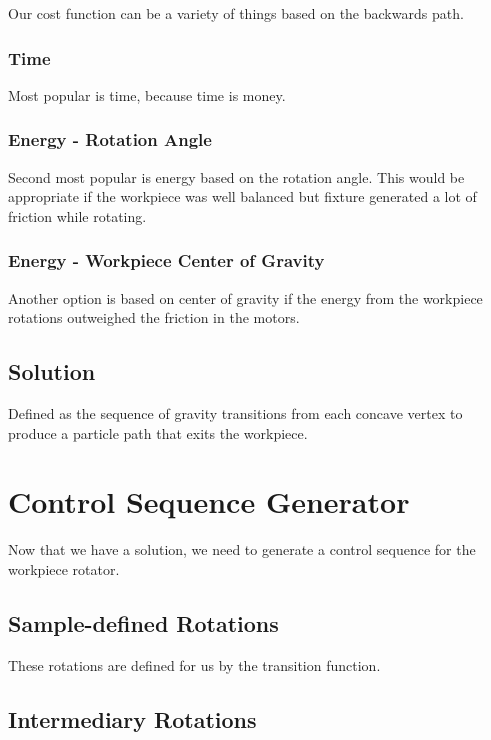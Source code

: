 Our cost function can be a variety of things based on the backwards path.

		\subsubsection{Time}

Most popular is time, because time is money.

		\subsubsection{Energy - Rotation Angle}

Second most popular is energy based on the rotation angle. This would be appropriate if the workpiece was well balanced but fixture generated a lot of friction while rotating.

		\subsubsection{Energy - Workpiece Center of Gravity}

Another option is based on center of gravity if the energy from the workpiece rotations outweighed the friction in the motors.

	\subsection{Solution}

		Defined as the sequence of gravity transitions from each concave vertex to produce a particle path that exits the workpiece.

\section{Control Sequence Generator}

Now that we have a solution, we need to generate a control sequence for the workpiece rotator.

	\subsection{Sample-defined Rotations}

These rotations are defined for us by the transition function.

	\subsection{Intermediary Rotations}

